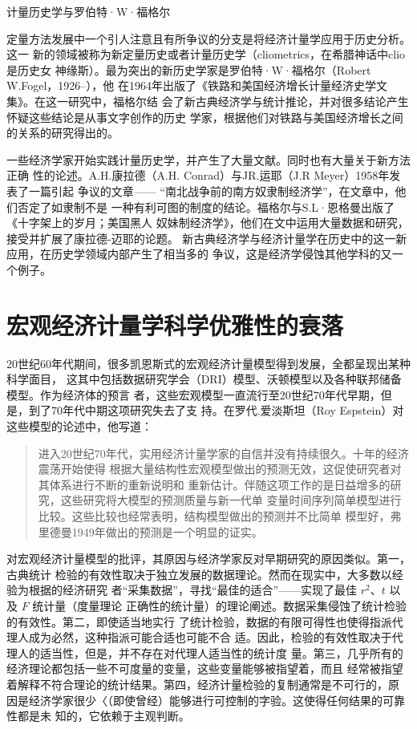 \begin{mybox}{计量历史学与罗伯特·W·福格尔}
  \begin{multicols}{2}
    定量方法发展中一个引人注意且有所争议的分支是将经济计量学应用于历史分析。这一
    新的领域被称为新定量历史或者计量历史学（cliometrics，在希腊神话中clio是历史女
    神缘斯）。最为突出的新历史学家是罗伯特·W·福格尔（Robert W.Fogel，1926--），他
    在1964年出版了《铁路和美国经济增长计量经济史学文集》。在这一研究中，福格尔结
    会了新古典经济学与统计推论，并对很多结论产生怀疑这些结论是从事文字创作的历史
    学家，根据他们对铁路与美国经济增长之间的关系的研究得出的。

    一些经济学家开始实践计量历史学，并产生了大量文献。同时也有大量关于新方法正确
    性的论述。A.H.康拉德（A.H. Conrad）与JR.运耶（J.R Meyer）1958年发表了一篇引起
    争议的文章—— “南北战争前的南方奴隶制经济学”，在文章中，他们否定了如隶制不是
    一种有利可图的制度的结论。福格尔与S.L·恩格曼出版了《十字架上的岁月；美国黑人
    奴妹制经济学》，他们在文中运用大量数据和研究，接受并扩展了康拉德-迈耶的论题。
    新古典经济学与经济计量学在历史中的这一新应用，在历史学领域内部产生了相当多的
    争议，这是经济学侵蚀其他学科的又一个例子。
  \end{multicols}
\end{mybox}

\section{宏观经济计量学科学优雅性的衰落}

20世纪60年代期间，很多凯恩斯式的宏观经济计量模型得到发展，全都呈现出某种科学面目，
这其中包括数据研究学会（DRI）模型、沃顿模型以及各种联邦储备模型。作为经济体的预言
者，这些宏观模型一直流行至20世纪70年代早期，但是，到了70年代中期这项研究失去了支
持。在罗代.爱淡斯坦（Roy Espstein）对这些模型的论述中，他写道：

\begin{quotation}
  进入20世纪70年代，实用经济计量学家的自信并没有持续很久。十年的经济震荡开始使得
  根据大量结构性宏观模型做出的预测无效，这促使研究者对其体系进行不断的重新说明和
  重新估计。伴随这项工作的是日益增多的研究，这些研究将大模型的预测质量与新一代单
  变量时间序列简单模型进行比较。这些比较也经常表明，结构模型做出的预测并不比简单
  模型好，弗里德曼1949年做出的预测是一个明显的证实。
\end{quotation}

对宏观经济计量模型的批评，其原因与经济学家反对早期研究的原因类似。第一，古典统计
检验的有效性取决于独立发展的数据理论。然而在现实中，大多数以经验为根据的经济研究
者“采集数据”，寻找“最佳的适合”——实现了最佳 $r^2、t$ 以及 $F$ 统计量（度量理论
正确性的统计量）的理论阐述。数据采集侵蚀了统计检验的有效性。第二，即使适当地实行
了统计检验，数据的有限可得性也使得指派代理人成为必然，这种指派可能合适也可能不合
适。因此，检验的有效性取决于代理人的适当性，但是，并不存在对代理人适当性的统计度
量。第三，几乎所有的经济理论都包括一些不可度量的变量，这些变量能够被指望着，而且
经常被指望着解释不符合理论的统计结果。第四，经济计量检验的复制通常是不可行的，原
因是经济学家很少〈（即使曾经）能够进行可控制的字验。这使得任何结果的可靠性都是未
知的，它依赖于主观判断。

